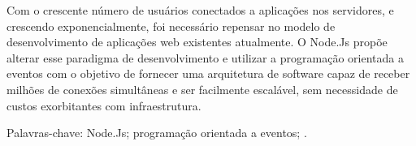 \begin{resumo}
\vspace{-1cm}

\onehalfspacing

\noindent 
  Com o crescente número de usuários conectados a aplicações nos servidores, e crescendo exponencialmente, 
  foi necessário repensar no modelo de desenvolvimento de aplicações web existentes atualmente. 
  O Node.Js propõe alterar esse paradigma de desenvolvimento e utilizar a programação orientada a eventos 
  com o objetivo de fornecer uma arquitetura de software capaz de receber milhões de conexões simultâneas 
  e ser facilmente escalável, sem necessidade de custos exorbitantes com infraestrutura.

\vspace*{.75cm}

\noindent Palavras-chave: Node.Js; programação orientada a eventos; .\\

\end{resumo}